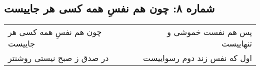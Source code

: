 \begin{center}
\section*{شماره ۸: چون هم نفسِ همه کسی هر جاییست}
\label{sec:008}
\begin{longtable}{l p{0.5cm} r}
چون هم نفسِ همه کسی هر جاییست
&&
پس هم نفست خموشی و تنهاییست
\\
در صدق ز صبح نیستی روشنتر
&&
اول که نفس زند دوم رسواییست
\\
\end{longtable}
\end{center}
